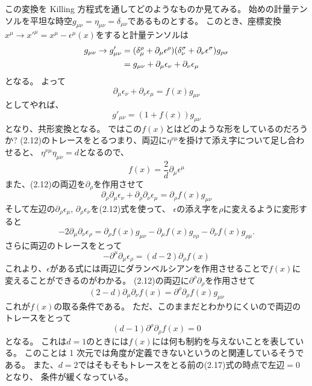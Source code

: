 \documentclass[../../master.tex]{subfiles}
\begin{document}
この変換を Killing 方程式を通してどのようなものか見てみる。
始めの計量テンソルを平坦な時空\(g_{\mu\nu}=\eta_{\mu\nu}=\delta_{\mu\nu}\)であるものとする。
このとき、座標変換\(x^\mu\rightarrow x'^\mu = x^\mu - \epsilon^\mu(x)\)をすると計量テンソルは
\begin{align*}
    g_{\mu\nu}\rightarrow g'_{\mu\nu}
    &=(\delta_\mu^\rho+\partial_\mu\epsilon^\rho)(\delta_\nu^\sigma+\partial_\nu\epsilon^\sigma)g_{\rho\sigma}\notag\\
    &=g_{\mu\nu} + \partial_\mu\epsilon_\nu + \partial_\nu\epsilon_\mu
\end{align*}
となる。
よって
\begin{equation}
    \partial_\mu\epsilon_\nu + \partial_\nu\epsilon_\mu = f(x)g_{\mu\nu}
\end{equation}
としてやれば、
\begin{equation*}
    g'_{\mu\nu} = (1+f(x))g_{\mu\nu}
\end{equation*}
となり、共形変換となる。
ではこの\(f(x)\)とはどのような形をしているのだろうか?
(2.12)のトレースをとるつまり、両辺に\(\eta^{\nu\mu}\)を掛けて添え字について足し合わせると、
\(\eta^{\nu\mu}\eta_{\mu\nu}=d\)となるので、
\begin{equation}
    f(x) = \frac{2}{d}\partial_\mu\epsilon^\mu
\end{equation}
また、(2.12)の両辺を\(\partial_\rho\)を作用させて
\begin{equation}
    \partial_\rho\partial_\mu\epsilon_\nu + \partial_\rho\partial_\nu\epsilon_\mu = \partial_\rho f(x)g_{\mu\nu}
\end{equation}
そして左辺の\(\partial_\rho\epsilon_\mu,\,\partial_\rho\epsilon_\nu\)を(2.12)式を使って、
\(\epsilon\)の添え字を\(\rho\)に変えるように変形すると
\begin{equation}
    -2\partial_\mu\partial_\nu\epsilon_\rho = \partial_\rho f(x)g_{\mu\nu} - \partial_\mu f(x)g_{\nu\rho} -\partial_\nu f(x)g_{\rho\mu}.
\end{equation}
さらに両辺のトレースをとって
\begin{equation}
    -\partial^\mu\partial_\mu \epsilon_\rho = (d-2)\partial_\rho f(x)
\end{equation}
これより、\(\epsilon\)がある式には両辺にダランベルシアンを作用させることで\(f(x)\)に変えることができるのがわかる。
(2.12)の両辺に\(\partial^\rho\partial_\rho\)を作用させて
\begin{equation}
    (2-d)\partial_\mu\partial_\nu f(x) = \partial^\rho\partial_\rho f(x) g_{\mu\nu}
\end{equation}
これが\(f(x)\)の取る条件である。
ただ、このままだとわかりにくいので両辺のトレースをとって
\begin{equation}
    (d-1)\partial^\rho\partial_\rho f(x) =0
\end{equation}
となる。
これは\(d=1\)のときには\(f(x)\)には何も制約を与えないことを表している。
このことは 1 次元では角度が定義できないというのと関連しているそうである。
また、\(d=2\)ではそもそもトレースをとる前の(2.17)式の時点で左辺\(=0\)となり、
条件が緩くなっている。
\end{document}
